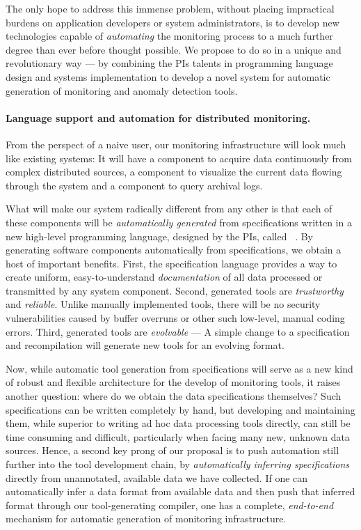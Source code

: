 The only hope to address this immense problem, without placing impractical
burdens on application developers or system administrators, is to develop
new technologies capable of {\em automating} the monitoring process
to a much further degree than ever before thought possible.  We propose to do
so in a unique and revolutionary way --- by combining the PIs talents
in programming language design and systems implementation to develop 
a novel system for automatic generation of monitoring and anomaly 
detection tools.

\paragraph*{Language support and automation for distributed monitoring.} 
From the perspect of a naive user,
our monitoring infrastructure will look much like
existing systems:  It will have 
a component to acquire data continuously 
from complex distributed sources, a component to visualize
the current data flowing through the system and a component 
to query archival logs.  

What will make our system radically different from any other is that each
of these components will be {\em automatically generated} from
specifications written in a new high-level programming language, 
designed by the PIs, called
\pads{}~\cite{fisher+:pads,fisher+:popl06,mandelbaum+:pads-ml}.  
By generating software components automatically from
specifications, we obtain a host of important benefits.  First, the
\pads{} specification language provides a way to create 
uniform, easy-to-understand {\em documentation} of all data processed
or transmitted by any system component.  Second, generated tools are
{\em trustworthy} and {\em reliable}. Unlike manually implemented
tools, there will be no security vulnerabilities caused by buffer
overruns or other such low-level, manual coding errors.  Third,
generated tools are {\em evolvable} --- A simple change to a
specification and recompilation will generate new tools for an
evolving format.

Now, while automatic tool generation from specifications will serve as 
a new kind of robust and flexible architecture for the develop of
monitoring tools, it raises another question: where do we obtain the
data specifications themselves?  Such specifications can be written completely
by hand, but developing and maintaining them,
while superior to writing ad hoc data processing tools directly, 
can still be time consuming and difficult, particularly when facing many
new, unknown data sources.  Hence, a second key prong of our proposal
is to push automation still further into the tool development chain,
by {\em automatically inferring specifications} directly from 
unannotated, available data we have collected.  If one can automatically
infer a data format from available data and then push that
inferred format through our tool-generating compiler, one has a
complete, {\em end-to-end} mechanism for automatic generation of
monitoring infrastructure. 

